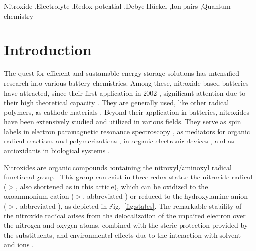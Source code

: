 \documentclass[review,preprint]{elsarticle}
\begin{document}
\begin{frontmatter}
		\begin{keyword}
			Nitroxide 
			\sep Electrolyte 
			\sep Redox potential
			\sep Debye-Hückel 
			\sep Ion pairs 
			\sep Quantum chemistry
			
			
			
		\end{keyword}
		
	\end{frontmatter}
	
	
\section{Introduction}


The quest for efficient and sustainable energy storage solutions has intensified research into various battery chemistries. Among these, nitroxide-based batteries have attracted, since their first application in 2002 \cite{nakaharaRechargeableBatteriesOrganic2002}, significant attention due to their high theoretical capacity \cite{friebeSustainableEnergyStorage2019,ernouldNitroxidesBatteryrelatedApplications2021,keDesigningStrategiesAdvanced2023}. They are generally used, like other radical polymers, as cathode materials \cite{okaRadicalPolymersRechargeable2020a,assummaNewConductingCopolymer2020}. Beyond their application in batteries, nitroxides have been extensively studied and utilized in various fields. They serve as spin labels in electron paramagnetic resonance spectroscopy \cite{torricellaNitroxideSpinLabels2021}, as mediators for organic radical reactions and polymerizations \cite{tebbenNitroxidesApplicationsSynthesis2011,leifertOrganicSynthesisUsing2023}, in organic electronic devices \cite{jiAirStableOrganicRadicals2020,xieNitroxideRadicalPolymers2021}, and as antioxidants in biological systems  \cite{souleChemistryBiologyNitroxide2007,lewandowskiNitroxidesAntioxidantsAnticancer2017,prescottBiologicalRelevanceFree2017}.

Nitroxides are organic compounds containing the nitroxyl/aminoxyl radical functional group \cite{berlinerHistoryUseNitroxides2012}. This group can exist in three redox states: the nitroxide radical ($>$, also shortened as  in this article), which can be oxidized to the oxoammonium cation ($>$, abbreviated ) or reduced to the hydroxylamine anion ($>$, abbreviated ), as depicted in Fig.~\ref{fig:states}. The remarkable stability of the nitroxide radical arises from the delocalization of the unpaired electron over the nitrogen and oxygen atoms, combined with the steric protection provided by the substituents, and environmental effects due to the interaction with solvent and ions \cite{grynovaOriginScopeLongRange2013,grynovaSwitchingRadicalStability2013}. 
\end{document}
